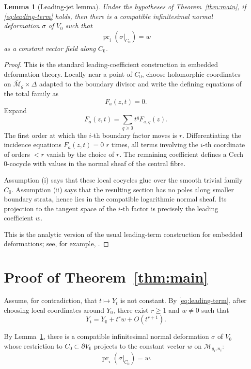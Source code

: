\documentclass[11pt]{amsart}
\newtheorem{lemma}[theorem]{Lemma}
\theoremstyle{definition}
\theoremstyle{remark}
\newcommand{\M}{\mathcal M}
\newcommand{\overlineM}{\overline{\mathcal M}}
\newcommand{\DD}{\Delta}
\begin{document}
\begin{lemma}[Leading-jet lemma]\label{lem:leading-jet}
Under the hypotheses of Theorem~\ref{thm:main}, if \eqref{eq:leading-term}
holds, then there is a compatible infinitesimal normal deformation
\(\sigma\) of \(V_0\) such that
\[
\operatorname{pr}_i(\sigma|_{C_0})=w
\]
as a constant vector field along \(C_0\).
\end{lemma}

\begin{proof}
This is the standard leading-coefficient construction in embedded
deformation theory. Locally near a point of \(C_0\), choose holomorphic
coordinates on \(\overlineM_g\times\DD\) adapted to the boundary divisor
and write the defining equations of the total family as
\[
F_a(z,t)=0.
\]
Expand
\[
F_a(z,t)=\sum_{q\geq0}t^qF_{a,q}(z).
\]
The first order at which the \(i\)-th boundary factor moves is \(r\).
Differentiating the incidence equations \(F_a(z,t)=0\) \(r\) times, all
terms involving the \(i\)-th coordinate of orders \(<r\) vanish by the
choice of \(r\). The remaining coefficient defines a Cech \(0\)-cocycle
with values in the normal sheaf of the central fibre.

Assumption (i) says that these local cocycles glue over the smooth trivial
family \(C_0\). Assumption (ii) says that the resulting section has no
poles along smaller boundary strata, hence lies in the compatible
logarithmic normal sheaf. Its projection to the tangent space of the
\(i\)-th factor is precisely the leading coefficient \(w\).

This is the analytic version of the usual leading-term construction for
embedded deformations; see, for example, \cite[Chapter~1]{Sernesi2006}.
\end{proof}

\section{Proof of Theorem~\ref{thm:main}}

Assume, for contradiction, that \(t\mapsto Y_t\) is not constant. By
\eqref{eq:leading-term}, after choosing local coordinates around \(Y_0\),
there exist \(r\geq1\) and \(w\neq0\) such that
\[
Y_t=Y_0+t^r w+O(t^{r+1}).
\]

By Lemma~\ref{lem:leading-jet}, there is a compatible infinitesimal
normal deformation \(\sigma\) of \(V_0\) whose restriction to
\(C_0\subset\partial V_0\) projects to the constant vector \(w\) on
\(\M_{g_i,n_i}\):
\[
\operatorname{pr}_i(\sigma|_{C_0})=w.
\]
\end{document}
